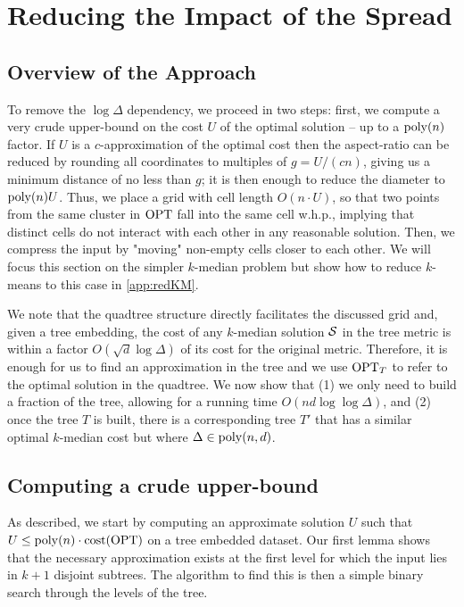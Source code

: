 \section{Reducing the Impact of the Spread}
\label{sec:logdelta}
\newcommand{\boxsize}{\textsc{MaxDist}}

\subsection{Overview of the Approach}

To remove the $\log\Delta$ dependency, we proceed in two steps: first, we compute a very crude upper-bound on the cost $U$ of the optimal solution -- up to
a $\operatorname{poly}(n)$ factor.  If $U$ is a $c$-approximation of the optimal cost then the aspect-ratio can be reduced by rounding all coordinates to multiples of $g
= U/(cn)$, giving us a minimum distance of no less than $g$; it is then enough to reduce the diameter to $\operatorname{poly}(n) U$.  Thus, we place a grid with cell length
$O(n \cdot U)$, so that two points from the same cluster in $\text{OPT}$ fall into the same cell w.h.p., implying that distinct cells do not interact with each other
in any reasonable solution.  Then, we compress the input by "moving" non-empty cells closer to each other. We will focus this section on the simpler $k$-median
problem but show how to reduce $k$-means to this case in \cref{app:redKM}.

We note that the quadtree structure directly facilitates the discussed grid and, given a tree embedding, the cost of any $k$-median solution $\mathcal S$ in the tree
metric is within a factor $O(\sqrt d \log \Delta)$ of its cost for the original metric.  Therefore, it is enough for us to find an approximation in the tree and
we use $\text{OPT}_T$ to refer to the optimal solution in the quadtree.  We now show that (1) we only need to build a fraction of the tree, allowing for a running
time $O(nd \log \log \Delta)$, and (2) once the tree $T$ is built, there is a corresponding tree $T'$ that has a similar optimal $k$-median cost but where
$\Delta \in \operatorname{poly}(n, d)$.

\subsection{Computing a crude upper-bound}

As described, we start by computing an approximate solution $U$ such that $U \leq \operatorname{poly}(n) \cdot \operatorname{cost}(\text{OPT})$ on a tree embedded dataset.  Our first lemma shows
that the necessary approximation exists at the first level for which the input lies in $k+1$ disjoint subtrees. The algorithm to find this is then a simple binary
search through the levels of the tree.


